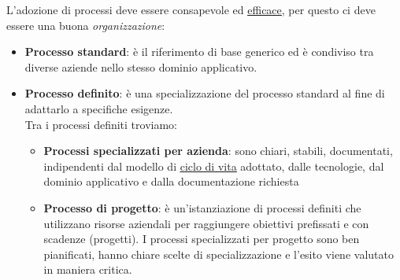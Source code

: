 		L'adozione di processi deve essere consapevole ed \underline{\hyperref[efficacia]{efficace}}, per questo ci deve essere una buona \textit{organizzazione}:
			\begin{itemize}
				\item \textbf{Processo standard}: è il riferimento di base generico ed è condiviso tra diverse aziende nello stesso dominio applicativo.
				\item \textbf{Processo definito}: è una specializzazione del processo standard al fine di adattarlo a specifiche esigenze. \\
				Tra i processi definiti troviamo:
				\begin{itemize}
					\item \textbf{Processi specializzati per azienda}: sono chiari, stabili, documentati, indipendenti dal modello di \underline{\hyperref[ciclo]{ciclo di vita}} adottato, dalle tecnologie, dal dominio applicativo e dalla documentazione richiesta
					\item  \textbf{Processo di progetto}: è un'istanziazione di processi definiti che utilizzano risorse aziendali per raggiungere obiettivi prefissati e con scadenze (progetti). I processi specializzati per progetto sono ben pianificati, hanno chiare scelte di specializzazione e l'esito viene valutato in maniera critica.
				\end{itemize}
			\end{itemize}

